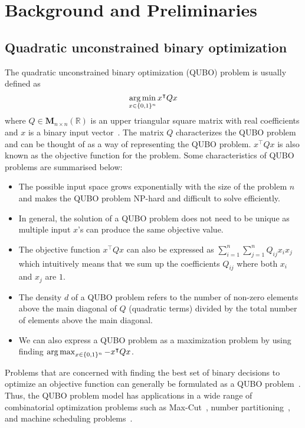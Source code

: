 
\chapter{Background and Preliminaries}
\vspace{2em}

\section{Quadratic unconstrained binary optimization}
The quadratic unconstrained binary optimization (QUBO) problem is usually defined as
\begin{equation} 
\operatorname*{arg\,min}_{x \in \{0, 1\}^n} x^\intercal Q x
\end{equation}
where $Q \in \boldsymbol{M}_{n\times n}(\mathbb{R})$ is an upper triangular square matrix with real coefficients and $x$ is a binary input vector~\cite{b1}. The matrix $Q$ characterizes the QUBO problem and can be thought of as a way of representing the QUBO problem. $x^\intercal Q x$ is also known as the objective function for the problem. Some characteristics of QUBO problems are summarised below:
\begin{itemize}
    \item The possible input space grows exponentially with the size of the problem $n$ and makes the QUBO problem NP-hard and difficult to solve efficiently.
    \item In general, the solution of a QUBO problem does not need to be unique as multiple input $x$'s can produce the same objective value.
    \item The objective function $x^\intercal Q x$ can also be expressed as $\sum_{i=1}^{n}\sum_{j=1}^{n} Q_{ij}x_{i}x_{j}$ which intuitively means that we sum up the coefficients $Q_{ij}$ where both $x_{i}$ and $x_{j}$ are $1$.
    \item The density $d$ of a QUBO problem refers to the number of non-zero elements above the main diagonal of $Q$ (quadratic terms) divided by the total number of elements above the main diagonal. 
    \item We can also express a QUBO problem as a maximization problem by using finding $\operatorname*{arg\,max}_{x \in \{0, 1\}^n} -x^\intercal Q x$.
\end{itemize}

Problems that are concerned with finding the best set of binary decisions to optimize an objective function can generally be formulated as a QUBO problem~\cite{b5}. Thus, the QUBO problem model has applications in a wide range of combinatorial optimization problems such as Max-Cut~\cite{b2}, number partitioning~\cite{b3}, and machine scheduling problems~\cite{b4}. 

